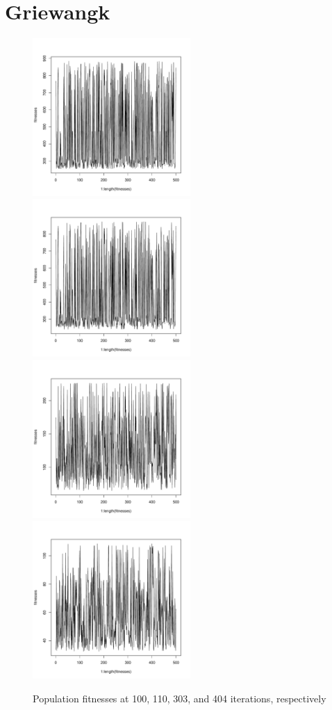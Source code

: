 \documentclass[12pt]{article}
\begin{document}
\section{Griewangk}
\begin{figure}[!h]
        \begin{center}
		\includegraphics[width=60mm]{images/griewangk.ss/ind_101.pdf}
		\includegraphics[width=60mm]{images/griewangk.ss/ind_110.pdf}
		\includegraphics[width=60mm]{images/griewangk.ss/ind_303.pdf}
		\includegraphics[width=60mm]{images/griewangk.ss/ind_404.pdf}
               	\caption{Population fitnesses at 100, 110, 303, and 404 iterations, respectively}
                \label{griewangk_ss_pop_fit}
        \end{center}
\end{figure}
\end{document}

